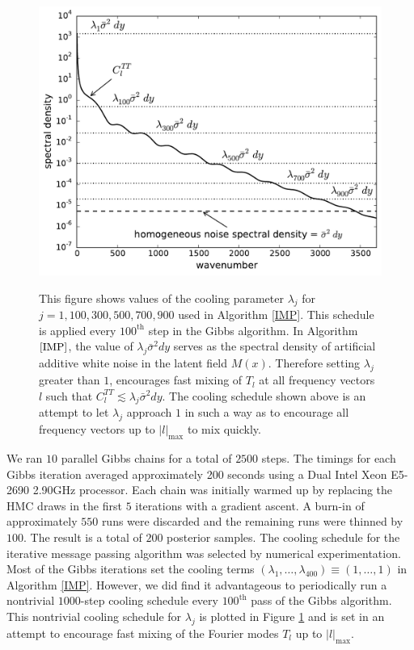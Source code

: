 \documentclass[iop,revtex4,apj,onecolumn]{emulateapj}
\begin{document}
\begin{figure}
\begin{center}
  {\includegraphics[width=.5\hsize]{figure4.pdf}}
\end{center}
\caption{
\label{cooling}
This figure shows values of the cooling parameter $\lambda_j$ for $j=1,100, 300, 500, 700, 900$ used in Algorithm \ref{IMP}.  This schedule is applied every $100^\text{th}$ step in the Gibbs algorithm.  In Algorithm $\ref{IMP}$, the value of $\lambda_j\bar{\sigma}^2dy$ serves as the spectral density of artificial additive white noise in the latent field $M(x)$. Therefore setting $\lambda_j$ greater than $1$,  encourages fast mixing of $T_l$ at all frequency vectors $l$ such that $C_l^{TT} \lesssim \lambda_j\bar{\sigma}^2dy$. The cooling schedule shown above is an attempt to let $\lambda_j$ approach $1$ in such a way as to encourage all frequency vectors up to $|l|_\text{max}$ to mix quickly. 
 }
\end{figure}

 

We ran $10$ parallel Gibbs chains for a total of $2500$ steps. The timings for each Gibbs iteration averaged approximately 200 seconds using a Dual Intel Xeon E5-2690 2.90GHz processor. Each chain was initially warmed up by replacing the HMC draws in the first $5$ iterations with a gradient ascent. A burn-in of approximately $550$ runs were discarded and the remaining runs were thinned by $100$. The result is a total of $200$ posterior samples. The cooling schedule for the iterative message passing algorithm was selected by numerical experimentation.  Most of the Gibbs iterations set the cooling terms $(\lambda_1,\ldots, \lambda_{400}) \equiv (1,\ldots, 1)$  in Algorithm \ref{IMP}. However, we did find it advantageous to periodically run a nontrivial $1000$-step cooling schedule every $100^\text{th}$ pass of the Gibbs algorithm. This nontrivial cooling schedule for $\lambda_j$ is plotted in Figure \ref{cooling} and is set in an attempt to encourage fast mixing of the Fourier modes $T_l$ up to $|l|_\text{max}$. 
\end{document}
